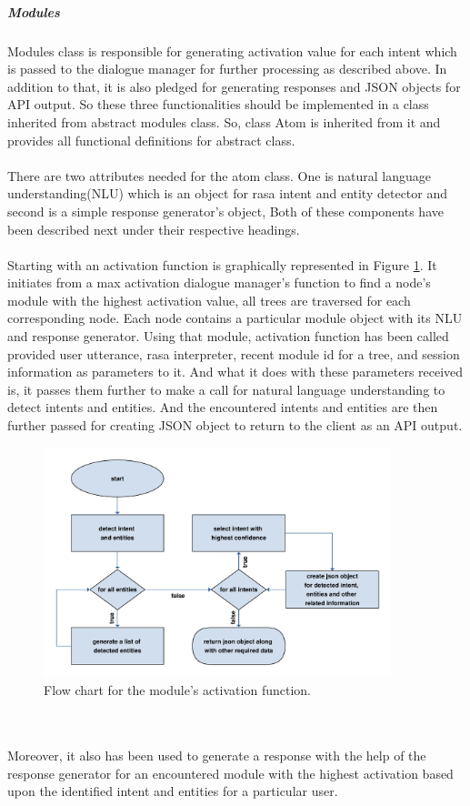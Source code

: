 \subparagraph*{Modules} Modules class is responsible for generating activation value for each intent which is passed to the dialogue manager for further processing as described above. In addition to that, it is also pledged for generating responses and JSON objects for API output. So these three functionalities should be implemented in a class inherited from abstract modules class. So, class Atom is inherited from it and provides all functional definitions for abstract class. 
\\~\\
There are two attributes needed for the atom class. One is natural language understanding(NLU) which is an object for rasa intent and entity detector and second is a simple response generator's object, Both of these components have been described next under their respective headings. 
\\~\\
Starting with an activation function is graphically represented in Figure \ref{fig:flowModule}. It initiates from a max activation dialogue manager's function to find a node's module with the highest activation value, all trees are traversed for each corresponding node. Each node contains a particular module object with its NLU and response generator. Using that module, activation function has been called provided user utterance, rasa interpreter, recent module id for a tree, and session information as parameters to it. And what it does with these parameters received is, it passes them further to make a call for natural language understanding to detect intents and entities. And the encountered intents and entities are then further passed for creating JSON object to return to the client as an API output. 

\begin{figure}[!h]
    \centering
    \includegraphics[width=0.9\textwidth]{img/module.pdf}
    \caption{Flow chart for the module's activation function.}
    \label{fig:flowModule}
\end{figure}
\\~\\
Moreover, it also has been used to generate a response with the help of the response generator for an encountered module with the highest activation based upon the identified intent and entities for a particular user.

